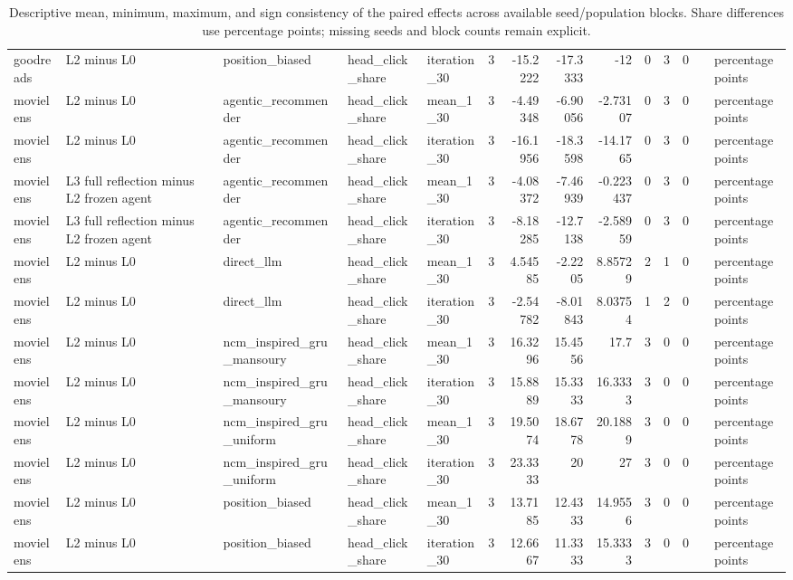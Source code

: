 \begin{table}[htbp!]
\begin{tabular}{lllllrrrrrrrll}
goodreads & L2 minus L0 & position\_biased & head\_click\_share & iteration\_30 & 3 & -15.2222 & -17.3333 & -12 & 0 & 3 & 0 &  & percentage points \\
movielens & L2 minus L0 & agentic\_recommender & head\_click\_share & mean\_1\_30 & 3 & -4.49348 & -6.90056 & -2.73107 & 0 & 3 & 0 &  & percentage points \\
movielens & L2 minus L0 & agentic\_recommender & head\_click\_share & iteration\_30 & 3 & -16.1956 & -18.3598 & -14.1765 & 0 & 3 & 0 &  & percentage points \\
movielens & L3 full reflection minus L2 frozen agent & agentic\_recommender & head\_click\_share & mean\_1\_30 & 3 & -4.08372 & -7.46939 & -0.223437 & 0 & 3 & 0 &  & percentage points \\
movielens & L3 full reflection minus L2 frozen agent & agentic\_recommender & head\_click\_share & iteration\_30 & 3 & -8.18285 & -12.7138 & -2.58959 & 0 & 3 & 0 &  & percentage points \\
movielens & L2 minus L0 & direct\_llm & head\_click\_share & mean\_1\_30 & 3 & 4.54585 & -2.2205 & 8.85729 & 2 & 1 & 0 &  & percentage points \\
movielens & L2 minus L0 & direct\_llm & head\_click\_share & iteration\_30 & 3 & -2.54782 & -8.01843 & 8.03754 & 1 & 2 & 0 &  & percentage points \\
movielens & L2 minus L0 & ncm\_inspired\_gru\_mansoury & head\_click\_share & mean\_1\_30 & 3 & 16.3296 & 15.4556 & 17.7 & 3 & 0 & 0 &  & percentage points \\
movielens & L2 minus L0 & ncm\_inspired\_gru\_mansoury & head\_click\_share & iteration\_30 & 3 & 15.8889 & 15.3333 & 16.3333 & 3 & 0 & 0 &  & percentage points \\
movielens & L2 minus L0 & ncm\_inspired\_gru\_uniform & head\_click\_share & mean\_1\_30 & 3 & 19.5074 & 18.6778 & 20.1889 & 3 & 0 & 0 &  & percentage points \\
movielens & L2 minus L0 & ncm\_inspired\_gru\_uniform & head\_click\_share & iteration\_30 & 3 & 23.3333 & 20 & 27 & 3 & 0 & 0 &  & percentage points \\
movielens & L2 minus L0 & position\_biased & head\_click\_share & mean\_1\_30 & 3 & 13.7185 & 12.4333 & 14.9556 & 3 & 0 & 0 &  & percentage points \\
movielens & L2 minus L0 & position\_biased & head\_click\_share & iteration\_30 & 3 & 12.6667 & 11.3333 & 15.3333 & 3 & 0 & 0 &  & percentage points \\
\hline
\end{tabular}
\caption{Descriptive mean, minimum, maximum, and sign consistency of the paired effects across available seed/population blocks. Share differences use percentage points; missing seeds and block counts remain explicit.}
\label{chap:results:tab:rq6_seed_consistency_head_click_share}
\end{table}
